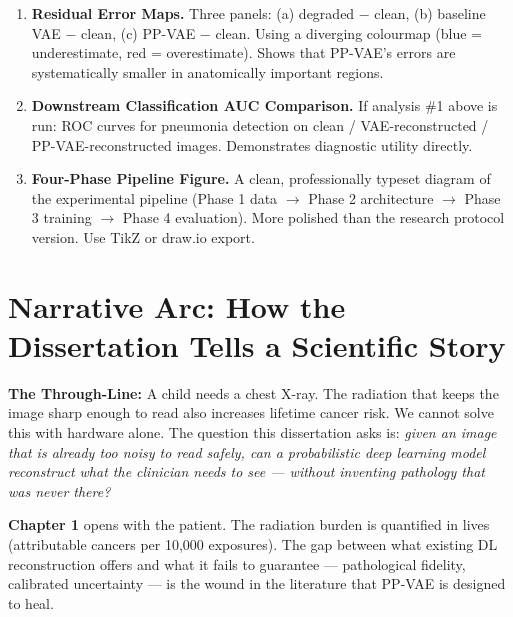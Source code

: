 \documentclass[12pt, a4paper]{article}
\begin{document}
\begin{enumerate}
\item \textbf{Residual Error Maps.}
Three panels: (a) degraded $-$ clean, (b) baseline VAE $-$ clean,
(c) PP-VAE $-$ clean. Using a diverging colourmap (blue = underestimate,
red = overestimate). Shows that PP-VAE's errors are systematically
smaller in anatomically important regions.

\item \textbf{Downstream Classification AUC Comparison.}
If analysis \#1 above is run: ROC curves for pneumonia detection
on clean / VAE-reconstructed / PP-VAE-reconstructed images.
Demonstrates diagnostic utility directly.

\item \textbf{Four-Phase Pipeline Figure.}
A clean, professionally typeset diagram of the experimental pipeline
(Phase 1 data $\rightarrow$ Phase 2 architecture $\rightarrow$
Phase 3 training $\rightarrow$ Phase 4 evaluation). More polished
than the research protocol version. Use TikZ or draw.io export.

\end{enumerate}

\section{Narrative Arc: How the Dissertation Tells a Scientific Story}

\begin{mdframed}[linecolor=darkblue, linewidth=2pt]
\textbf{The Through-Line:}
A child needs a chest X-ray. The radiation that keeps the image sharp
enough to read also increases lifetime cancer risk. We cannot solve this
with hardware alone. The question this dissertation asks is: \textit{given
an image that is already too noisy to read safely, can a probabilistic
deep learning model reconstruct what the clinician needs to see — without
inventing pathology that was never there?}
\end{mdframed}

\bigskip

\noindent\textbf{Chapter 1} opens with the patient. The radiation burden
is quantified in lives (attributable cancers per 10,000 exposures).
The gap between what existing DL reconstruction offers and what it fails
to guarantee — pathological fidelity, calibrated uncertainty — is the
wound in the literature that PP-VAE is designed to heal.
\end{document}
